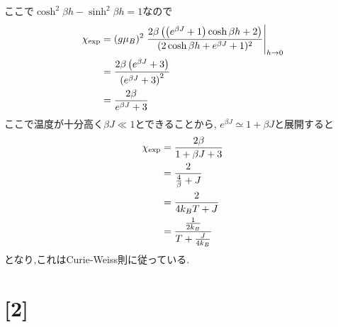\documentclass[uplatex,a4j,11pt,dvipdfmx]{jsarticle}
\begin{document}
ここで$\cosh^2\beta h-\sinh^2\beta h=1$なので
\begin{align}
  \begin{split}
    \chi_{\rm exp}&=(g\mu_B)^2\left.\frac{2\beta\left(\left(e^{\beta J}+1\right)\cosh\beta h+2\right)}{(2\cosh\beta h+e^{\beta J}+1)^2}\right|_{h\rightarrow0}\\
    &=\frac{2\beta\left(e^{\beta J}+3\right)}{\left(e^{\beta J}+3\right)^2}\\
    &=\frac{2\beta}{e^{\beta J}+3}
  \end{split}
\end{align}
ここで温度が十分高く$\beta J\ll1$とできることから,
$e^{\beta J}\simeq1+\beta J$と展開すると
\begin{align}
  \begin{split}
    \chi_{\rm exp}&=\frac{2\beta}{1+\beta J+3}\\
    &=\frac{2}{\frac{4}{\beta}+J}\\
    &=\frac{2}{4k_BT+J}\\
    &=\frac{\frac{1}{2k_B}}{T+\frac{J}{4k_B}}
  \end{split}
\end{align}
となり,これはCurie-Weiss則に従っている.
\section*{[2]}

\end{document}
